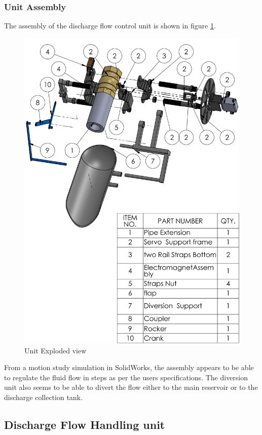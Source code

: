 \subsubsection{Unit Assembly}
The assembly of the discharge flow control unit is shown in figure \ref{fig:unit_exploded_view}.
\begin{figure}[H]
    \centering
    \includegraphics{Figures/DischargeFlowDiverSionAssembly5.PNG}
    \caption{Unit Exploded view}
    \label{fig:unit_exploded_view}
\end{figure}
From a motion study simulation in SolidWorks, the assembly appears to be able to regulate the fluid flow in steps as per the users specifications. The diversion unit also seems to be able to divert the flow either to the main reservoir or to the discharge collection tank.

\subsection{Discharge Flow Handling unit}
